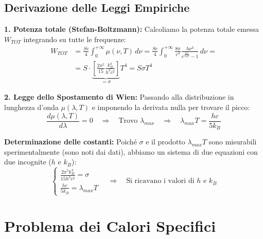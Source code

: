 \documentclass[11pt, a4paper]{article}
\begin{document}
\subsection{Derivazione delle Leggi Empiriche} %

\textbf{1. Potenza totale (Stefan-Boltzmann):} %
Calcoliamo la potenza totale emessa $W_{TOT}$ integrando su tutte le frequenze: %
\begin{align*}
    W_{TOT} &= \frac{S c}{4} \int_0^{+\infty} \mu(\nu, T) \, d\nu = \frac{S c}{4} \int_0^{+\infty} \frac{8\pi}{c^3} \frac{h\nu^3}{e^{\frac{h\nu}{k_B T}} - 1} \, d\nu = \\
    &= S \cdot \underbrace{\left[ \frac{2\pi^5}{15} \frac{k_B^4}{h^3 c^2} \right]}_{=\sigma} T^4 = S \sigma T^4 %
\end{align*}

\noindent
\textbf{2. Legge dello Spostamento di Wien:} %
Passando alla distribuzione in lunghezza d'onda $\mu(\lambda, T)$ e imponendo la derivata nulla per trovare il picco: %
\begin{equation*}
    \frac{d\mu(\lambda, T)}{d\lambda} = 0 \quad \Rightarrow \quad \text{Trovo } \lambda_{max} \quad \Rightarrow \quad \lambda_{max} T = \frac{hc}{5 k_B} %
\end{equation*}

\noindent
\textbf{Determinazione delle costanti:} %
Poiché $\sigma$ e il prodotto $\lambda_{max}T$ sono misurabili sperimentalmente (sono noti dai dati), abbiamo un sistema di due equazioni con due incognite ($h$ e $k_B$): %
\begin{equation}
    \begin{cases}
        \frac{2\pi^5 k_B^4}{15 h^3 c^2} = \sigma \\
        \frac{hc}{5 k_B} = \lambda_{max} T
    \end{cases} \quad \Rightarrow \quad \boxed{ \text{Si ricavano i valori di } h \text{ e } k_B } %
\end{equation}

\section{Problema dei Calori Specifici} %
\end{document}

